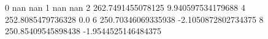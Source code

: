 0 nan nan
1 nan nan
2 262.7491455078125 9.940597534179688
4 252.8085479736328 0.0
6 250.70346069335938 -2.1050872802734375
8 250.85409545898438 -1.9544525146484375
